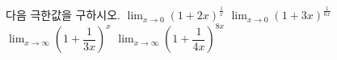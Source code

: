 다음 극한값을 구하시오.
 $\displaystyle\lim_{x\to 0}(1+2x)^{\frac{1}{x}}$
 $\displaystyle\lim_{x\to 0}(1+3x)^{\frac{1}{6x}}$
 $\displaystyle\lim_{x\to\infty}\left(1+\dfrac{1}{3x}\right)^{x}$
 $\displaystyle\lim_{x\to\infty}\left(1+\dfrac{1}{4x}\right)^{8x}$
